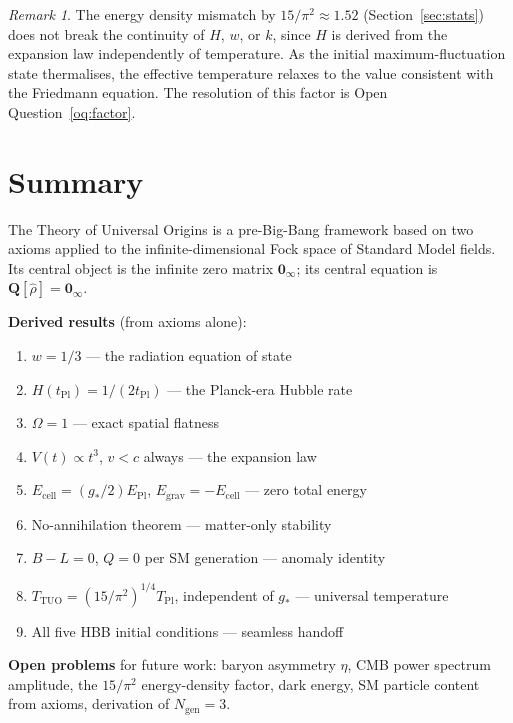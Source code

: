 \documentclass[12pt,a4paper]{article}
\theoremstyle{definition}
\theoremstyle{remark}
\newtheorem{remark}[theorem]{Remark}
\newcommand{\EPl}{E_{\mathrm{Pl}}}
\newcommand{\tPl}{t_{\mathrm{Pl}}}
\newcommand{\TPl}{T_{\mathrm{Pl}}}
\newcommand{\gstar}{g_{*}}
\newcommand{\ZeroMat}{\mathbf{0}_{\infty}}
\newcommand{\rhohat}{\hat{\rho}}
\newcommand{\TTUO}{T_{\mathrm{TUO}}}
\begin{document}
\begin{remark}
The energy density mismatch by $15/\pi^2 \approx 1.52$ (Section~\ref{sec:stats})
does not break the continuity of $H$, $w$, or $k$, since $H$ is derived
from the expansion law independently of temperature.
As the initial maximum-fluctuation state thermalises, the effective
temperature relaxes to the value consistent with the Friedmann equation.
The resolution of this factor is Open Question~\ref{oq:factor}.
\end{remark}

\section{Summary}
\label{sec:summary}

The Theory of Universal Origins is a pre-Big-Bang framework based on two
axioms applied to the infinite-dimensional Fock space of Standard Model fields.
Its central object is the infinite zero matrix $\ZeroMat$; its central
equation is $\mathbf{Q}[\rhohat] = \ZeroMat$.

\noindent\textbf{Derived results} (from axioms alone):
\begin{enumerate}[leftmargin=2.5em]
  \item $w = 1/3$ --- the radiation equation of state
  \item $H(\tPl) = 1/(2\tPl)$ --- the Planck-era Hubble rate
  \item $\Omega = 1$ --- exact spatial flatness
  \item $V(t) \propto t^3$, $v < c$ always --- the expansion law
  \item $E_\mathrm{cell} = (\gstar/2)\EPl$, $E_\mathrm{grav} = -E_\mathrm{cell}$ --- zero total energy
  \item No-annihilation theorem --- matter-only stability
  \item $B-L = 0$, $Q = 0$ per SM generation --- anomaly identity
  \item $\TTUO = (15/\pi^2)^{1/4}\TPl$, independent of $\gstar$ --- universal temperature
  \item All five HBB initial conditions --- seamless handoff
\end{enumerate}

\noindent\textbf{Open problems} for future work:
baryon asymmetry $\eta$,
CMB power spectrum amplitude,
the $15/\pi^2$ energy-density factor,
dark energy,
SM particle content from axioms,
derivation of $N_\mathrm{gen} = 3$.
\end{document}

